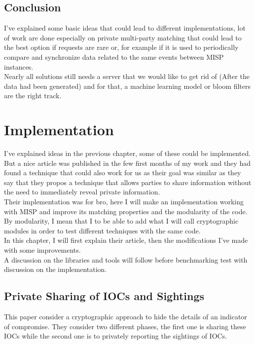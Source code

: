 \documentclass{eplmastersthesis}
\begin{document}
\section{Conclusion}
I've explained some basic ideas that could lead to different implementations, lot of work are done especially on private multi-party matching that could lead to the best option if requests are rare or, for example if it is used to periodically compare and synchronize data related to the same events between MISP instances.\\
Nearly all solutions still needs a server that we would like to get rid of (After the data had been generated) and for that, a machine learning model or bloom filters are the right track.

\chapter{Implementation}
I've explained ideas in the previous chapter, some of these could be implemented. But a nice article \cite{van2016private} was published in the few first months of my work and they had found a technique that could also work for us as their goal was similar as they say that they propos a technique that allows parties to share information without the need to immediately reveal private information.\\
Their implementation was for bro, here I will make an implementation working with MISP and improve its matching properties and the modularity of the code. \\
By modularity, I mean that I to be able to add what I will call cryptographic modules in order to test different techniques with the same code.\\
In this chapter, I will first explain their article, then the modifications I've made with some improvements.\\
A discussion on the libraries and tools will follow before benchmarking test with discussion on the implementation.

\section{Private Sharing of IOCs and Sightings \cite{van2016private}}
This paper consider a cryptographic approach to hide the details of an indicator of compromise. They consider two different phases, the first one is sharing these IOCs while the second one is to privately reporting the sightings of IOCs.\\
\end{document}
